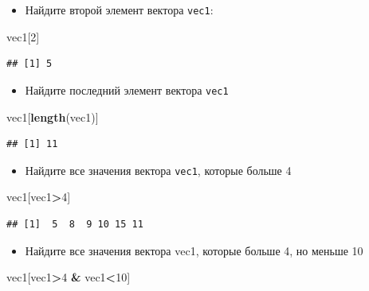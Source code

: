 \documentclass[]{book}
\newenvironment{Shaded}{\begin{snugshade}}{\end{snugshade}}
\newcommand{\DecValTok}[1]{\textcolor[rgb]{0.00,0.00,0.81}{#1}}
\newcommand{\KeywordTok}[1]{\textcolor[rgb]{0.13,0.29,0.53}{\textbf{#1}}}
\newcommand{\NormalTok}[1]{#1}
\newcommand{\OperatorTok}[1]{\textcolor[rgb]{0.81,0.36,0.00}{\textbf{#1}}}
\newcommand{\StringTok}[1]{\textcolor[rgb]{0.31,0.60,0.02}{#1}}
\providecommand{\tightlist}{%
  \setlength{\itemsep}{0pt}\setlength{\parskip}{0pt}}
\begin{document}
\begin{itemize}
\tightlist
\item
  Найдите второй элемент вектора \texttt{vec1}:
\end{itemize}

\begin{Shaded}
\begin{Highlighting}[]
\NormalTok{vec1[}\DecValTok{2}\NormalTok{]}
\end{Highlighting}
\end{Shaded}

\begin{verbatim}
## [1] 5
\end{verbatim}

\begin{itemize}
\tightlist
\item
  Найдите последний элемент вектора \texttt{vec1}
\end{itemize}

\begin{Shaded}
\begin{Highlighting}[]
\NormalTok{vec1[}\KeywordTok{length}\NormalTok{(vec1)]}
\end{Highlighting}
\end{Shaded}

\begin{verbatim}
## [1] 11
\end{verbatim}

\begin{itemize}
\tightlist
\item
  Найдите все значения вектора \texttt{vec1}, которые больше 4
\end{itemize}

\begin{Shaded}
\begin{Highlighting}[]
\NormalTok{vec1[vec1}\OperatorTok{>}\DecValTok{4}\NormalTok{]}
\end{Highlighting}
\end{Shaded}

\begin{verbatim}
## [1]  5  8  9 10 15 11
\end{verbatim}

\begin{itemize}
\tightlist
\item
  Найдите все значения вектора vec1, которые больше 4, но меньше 10
\end{itemize}

\begin{Shaded}
\begin{Highlighting}[]
\NormalTok{vec1[vec1}\OperatorTok{>}\DecValTok{4} \OperatorTok{&}\StringTok{ }\NormalTok{vec1}\OperatorTok{<}\DecValTok{10}\NormalTok{]}
\end{Highlighting}
\end{Shaded}
\end{document}
